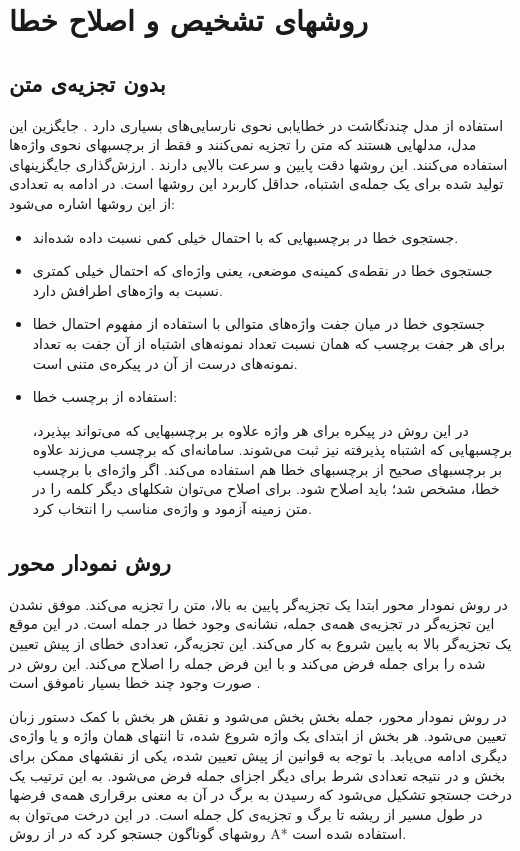 \documentclass{report}
\begin{document}
\section{روشهای تشخیص و اصلاح خطا}
\subsection{بدون تجزیه‌ی متن}
استفاده از مدل چند‌نگاشت در خطایابی نحوی نارسایی‌های بسیاری دارد \cite{ct7}. جایگزین این مدل، مدلهایی هستند که متن را تجزیه نمی‌کنند و فقط از برچسبهای نحوی واژه‌ها استفاده می‌کنند. این روشها دقت پایین و سرعت بالایی دارند \cite{ct8}. ارزش‌گذاری جایگزینهای تولید شده برای یک جمله‌ی اشتباه، حداقل کاربرد این روشها است. در ادامه به تعدادی از این روشها اشاره می‌شود:
\begin{itemize}
\item
جستجوی‌ خطا در برچسبهایی که با احتمال خیلی کمی نسبت داده شده‌اند.
\item
جستجوی خطا در نقطه‌ی کمینه‌ی موضعی، یعنی واژه‌ای که احتمال خیلی کمتری نسبت به واژه‌های اطرافش دارد.
\item
جستجوی خطا در میان جفت واژه‌های متوالی با استفاده از مفهوم احتمال خطا برای هر جفت برچسب که همان نسبت تعداد نمونه‌های اشتباه از آن جفت به تعداد نمونه‌های درست از آن در پیکره‌ی متنی است.
\item
استفاده از برچسب خطا:

در این روش در پیکره برای هر واژه علاوه بر برچسبهایی که می‌تواند بپذیرد، برچسبهایی که اشتباه پذیرفته نیز ثبت می‌شوند. سامانه‌ای که برچسب می‌زند علاوه بر برچسبهای صحیح از برچسبهای خطا هم استفاده می‌کند. اگر واژه‌ای با برچسب خطا، مشخص شد؛ باید اصلاح شود. برای اصلاح می‌توان شکلهای دیگر کلمه را در متن زمینه آزمود و واژه‌ی مناسب را انتخاب کرد.
\end{itemize}

\subsection{روش نمودار محور}
در روش نمودار محور ابتدا یک تجزیه‌گر پایین به بالا، متن را تجزیه می‌کند. موفق نشدن این تجزیه‌گر در تجزیه‌ی همه‌ی جمله، نشانه‌ی وجود خطا در جمله است. در این موقع یک تجزیه‌گر بالا به پایین شروع به کار می‌کند. این تجزیه‌گر، تعدادی خطای از پیش تعیین شده را برای جمله فرض می‌کند و با این فرض جمله را اصلاح می‌کند. این روش در صورت وجود چند خطا بسیار ناموفق است \cite{ct9}.

در روش نمودار محور، جمله بخش بخش می‌شود و نقش هر بخش با کمک دستور زبان تعیین می‌شود. هر بخش از ابتدای یک واژه شروع شده، تا انتهای همان واژه و یا واژه‌ی دیگری ادامه می‌یابد. با توجه به قوانین از پیش تعیین شده، یکی از نقشهای ممکن برای بخش و در نتیجه تعدادی شرط برای دیگر اجزای جمله فرض می‌شود. به این ترتیب یک درخت جستجو تشکیل می‌شود که رسیدن به برگ در آن به معنی برقراری همه‌ی فرضها در طول مسیر از ریشه تا برگ و تجزیه‌ی کل جمله است. در این درخت می‌توان به روشهای گوناگون جستجو کرد که در \cite{ct10} از روش A* استفاده شده است.
\end{document}
